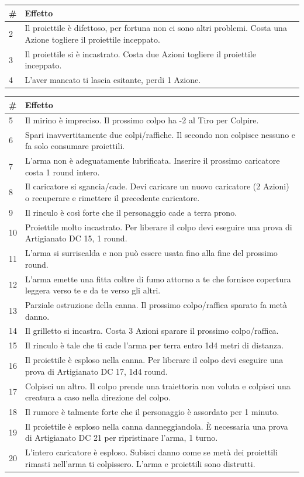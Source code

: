 \begin{multicols}{2}
\noindent\begin{tabularx}{\linewidth}{lX}
	\toprule
\rowcolor{gray!20}\textbf{\#}& \textbf{Effetto}\\
\toprule
2 & Il proiettile è difettoso, per fortuna non ci sono altri problemi. Costa una Azione togliere il proiettile inceppato.\\
\rowcolor{gray!20}3 & Il proiettile si è incastrato. Costa due Azioni togliere il proiettile inceppato.\\
4 & L'aver mancato ti lascia esitante, perdi 1 Azione.\\
\end{tabularx}
\noindent\begin{tabularx}{\linewidth}{lX}
\rowcolor{gray!20}\textbf{\#}& \textbf{Effetto}\\
\toprule
5 & Il mirino è impreciso. Il prossimo colpo ha -2 al Tiro per Colpire.\\
\rowcolor{gray!20}6 & Spari inavvertitamente due colpi/raffiche. Il secondo non colpisce nessuno e fa solo consumare proiettili.\\
7 & L'arma non è adeguatamente lubrificata. Inserire il prossimo caricatore costa 1 round intero.\\
\rowcolor{gray!20}8 & Il caricatore si sgancia/cade. Devi caricare un nuovo caricatore (2 Azioni) o recuperare e rimettere il precedente caricatore.\\
9 & Il rinculo è così forte che il personaggio cade a terra prono.\\
\rowcolor{gray!20}10 & Proiettile molto incastrato. Per liberare il colpo devi eseguire una prova di Artigianato DC 15, 1 round.\\
11 & L'arma si surriscalda e non può essere usata fino alla fine del prossimo round.\\
\rowcolor{gray!20}12 & L'arma emette una fitta coltre di fumo attorno a te che fornisce copertura leggera verso te e da te verso gli altri.\\
13 & Parziale ostruzione della canna. Il prossimo colpo/raffica sparato fa metà danno.\\
\rowcolor{gray!20}14 & Il grilletto si incastra. Costa 3 Azioni sparare il prossimo colpo/raffica.\\
15 & Il rinculo è tale che ti cade l'arma per terra entro 1d4 metri di distanza.\\
\rowcolor{gray!20}16 & Il proiettile è esploso nella canna. Per liberare il colpo devi eseguire una prova di Artigianato DC 17, 1d4 round.\\
17 & Colpisci un altro. Il colpo prende una traiettoria non voluta e colpisci una creatura a caso nella direzione del colpo.\\
\rowcolor{gray!20}18 & Il rumore è talmente forte che il personaggio è assordato per 1 minuto.\\
19 & Il proiettile è esploso nella canna danneggiandola. È necessaria una prova di Artigianato DC 21 per ripristinare l'arma, 1 turno.\\
\rowcolor{gray!20}20 & L'intero caricatore è esploso. Subisci danno come se metà dei proiettili rimasti nell'arma ti colpissero. L'arma e proiettili sono distrutti.
\end{tabularx}


\end{multicols}
